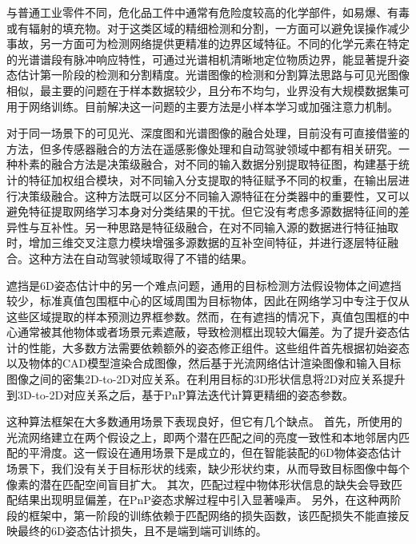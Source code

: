 \documentclass[12pt]{article}
\begin{document}
与普通工业零件不同，危化品工件中通常有危险度较高的化学部件，如易爆、有毒或有辐射的填充物。对于这类区域的精细检测和分割，一方面可以避免误操作减少事故，另一方面可为检测网络提供更精准的边界区域特征。不同的化学元素在特定的光谱谱段有脉冲响应特性，可通过光谱相机清晰地定位物质边界，能显著提升姿态估计第一阶段的检测和分割精度。光谱图像的检测和分割算法思路与可见光图像相似，最主要的问题在于样本数据较少，且分布不均匀，业界没有大规模数据集可用于网络训练。目前解决这一问题的主要方法是小样本学习\cite{lys2022targetDetection, shi2020HyperspectralTargetDetection}或加强注意力机制\cite{shi2020hyperspectralROI}。

对于同一场景下的可见光、深度图和光谱图像的融合处理，目前没有可直接借鉴的方法，但多传感器融合的方法在遥感影像处理和自动驾驶领域中都有相关研究。一种朴素的融合方法是决策级融合，对不同的输入数据分别提取特征图\cite{pang2020clocs}，构建基于统计的特征加权组合模块，对不同输入分支提取的特征赋予不同的权重，在输出层进行决策级融合\cite{li2022sal}。这种方法既可以区分不同输入源特征在分类器中的重要性，又可以避免特征提取网络学习本身对分类结果的干扰。但它没有考虑多源数据特征间的差异性与互补性。另一种思路是特征级融合，在对不同输入源的数据进行特征抽取时，增加三维交叉注意力模块\cite{li2022triplet}增强多源数据的互补空间特征，并进行逐层特征融合。这种方法在自动驾驶领域\cite{huang2020epnet}取得了不错的结果。

遮挡是6D姿态估计中的另一个难点问题，通用的目标检测方法假设物体之间遮挡较少，标准真值包围框中心的区域周围为目标物体，因此在网络学习中专注于仅从这些区域提取的样本预测边界框参数。然而，在有遮挡的情况下，真值包围框的中心通常被其他物体或者场景元素遮蔽，导致检测框出现较大偏差。为了提升姿态估计的性能，大多数方法需要依赖额外的姿态修正组件。这些组件首先根据初始姿态以及物体的CAD模型渲染合成图像，然后基于光流网络估计渲染图像和输入目标图像之间的密集2D-to-2D对应关系。在利用目标的3D形状信息将2D对应关系提升到3D-to-2D对应关系之后，基于PnP算法迭代计算更精细的姿态参数。

这种算法框架在大多数通用场景下表现良好，但它有几个缺点。
首先，所使用的光流网络建立在两个假设之上，即两个潜在匹配之间的亮度一致性和本地邻居内匹配的平滑度。这一假设在通用场景下是成立的，但在智能装配的6D物体姿态估计场景下，我们没有关于目标形状的线索，缺少形状约束，从而导致目标图像中每个像素的潜在匹配空间盲目扩大。
其次，匹配过程中物体形状信息的缺失会导致匹配结果出现明显偏差，在PnP姿态求解过程中引入显著噪声。
另外，在这种两阶段的框架中，第一阶段的训练依赖于匹配网络的损失函数，该匹配损失不能直接反映最终的6D姿态估计损失，且不是端到端可训练的。
\end{document}
